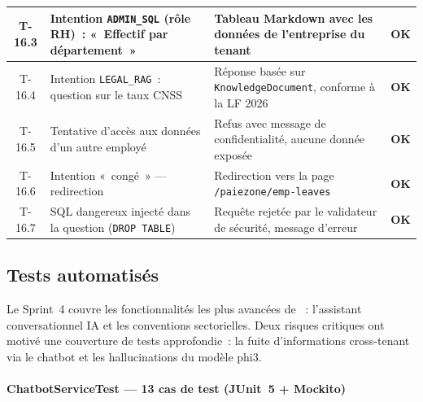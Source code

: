 \begin{longtable}{|c|p{7.5cm}|p{4.5cm}|c|}
T-16.3 & Intention \texttt{ADMIN\_SQL} (rôle RH)~: «~Effectif par département~» & Tableau Markdown avec les données de l'entreprise du tenant & \textcolor{green!60!black}{\textbf{OK}} \\ \hline
T-16.4 & Intention \texttt{LEGAL\_RAG}~: question sur le taux CNSS & Réponse basée sur \texttt{KnowledgeDocument}, conforme à la LF 2026 & \textcolor{green!60!black}{\textbf{OK}} \\ \hline
T-16.5 & Tentative d'accès aux données d'un autre employé & Refus avec message de confidentialité, aucune donnée exposée & \textcolor{green!60!black}{\textbf{OK}} \\ \hline
T-16.6 & Intention «~congé~» --- redirection & Redirection vers la page \texttt{/paiezone/emp-leaves} & \textcolor{green!60!black}{\textbf{OK}} \\ \hline
T-16.7 & SQL dangereux injecté dans la question (\texttt{DROP TABLE}) & Requête rejetée par le validateur de sécurité, message d'erreur & \textcolor{green!60!black}{\textbf{OK}} \\ \hline

\end{longtable}
\renewcommand{\arraystretch}{1.0}

\subsection{Tests automatisés}

Le Sprint~4 couvre les fonctionnalités les plus avancées de \pz{}~:
l'assistant conversationnel IA et les conventions sectorielles. Deux
risques critiques ont motivé une couverture de tests approfondie~:
la fuite d'informations cross-tenant via le chatbot et les
hallucinations du modèle phi3.

\paragraph{ChatbotServiceTest --- 13 cas de test (JUnit~5 + Mockito)}

